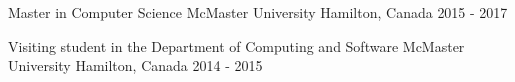 \begin{cventries}
	\cvedu
    {Master in Computer Science}
    {McMaster University}
    {Hamilton, Canada}
    {2015 - 2017}
   
    \cvedu
    {Visiting student in the Department of Computing and Software}
    {McMaster University}
    {Hamilton, Canada}
    {2014 - 2015}
   
  

\end{cventries}